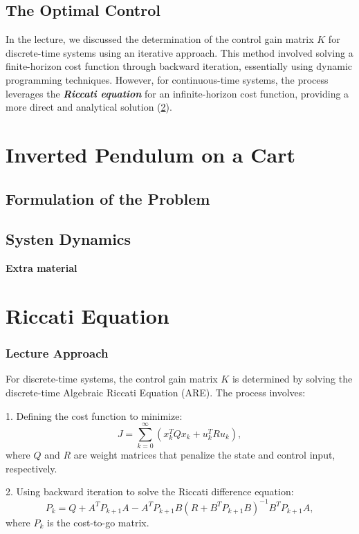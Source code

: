 \documentclass[a4 paper]{article}
\begin{document}
\subsection{The Optimal Control}
In the lecture, we discussed the determination of the control gain matrix \( K \) for discrete-time systems using an iterative approach. 
This method involved solving a finite-horizon cost function through backward iteration, essentially using dynamic programming techniques. 
However, for continuous-time systems, the process leverages the \textit{\textbf{Riccati equation}} for an infinite-horizon cost function, 
providing a more direct and analytical solution (\ref{sec:riccati}).

\section{Inverted Pendulum on a Cart}

\subsection{Formulation of the Problem}

\subsection{Systen Dynamics}


\newpage
\textbf{\huge{Extra material}}

\section{Riccati Equation}\label{sec:riccati}


\subsubsection{Lecture Approach}
For discrete-time systems, the control gain matrix \( K \) is determined by solving the discrete-time Algebraic Riccati Equation (ARE). The process involves:

1. Defining the cost function to minimize:
   \[
   J = \sum_{k=0}^{\infty} \left( x_k^T Q x_k + u_k^T R u_k \right),
   \]
   where \( Q \) and \( R \) are weight matrices that penalize the state and control input, respectively.

2. Using backward iteration to solve the Riccati difference equation:
   \[
   P_k = Q + A^T P_{k+1} A - A^T P_{k+1} B (R + B^T P_{k+1} B)^{-1} B^T P_{k+1} A,
   \]
   where \( P_k \) is the cost-to-go matrix.
\end{document}
